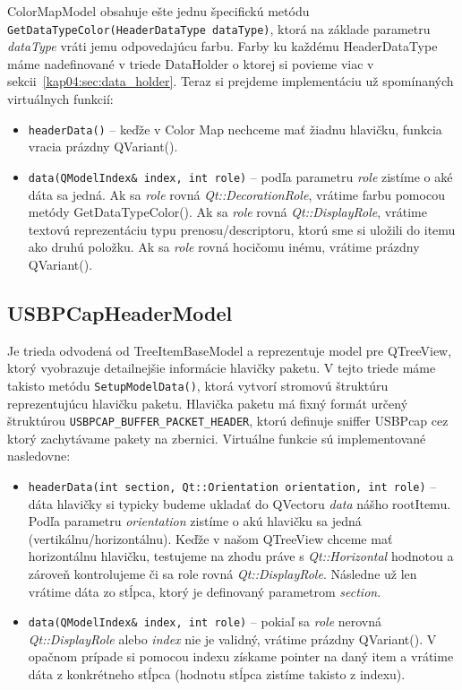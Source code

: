 ColorMapModel obsahuje ešte jednu špecifickú metódu \newline\texttt{GetDataTypeColor(HeaderDataType dataType)}, ktorá na základe parametru \textit{dataType} vráti jemu odpovedajúcu farbu. Farby ku každému HeaderDataType máme nadefinované v triede DataHolder o ktorej si povieme viac v sekcii~\ref{kap04:sec:data_holder}. Teraz si prejdeme implementáciu už spomínaných virtuálnych funkcií:
\begin{itemize}
\item \texttt{headerData()} -- keďže v Color Map nechceme mať žiadnu hlavičku, funkcia vracia prázdny QVariant().
\item \texttt{data(QModelIndex\& index, int role)} -- podľa parametru \textit{role} zistíme o aké dáta sa jedná. Ak sa \textit{role} rovná \textit{Qt::DecorationRole}, vrátime farbu pomocou metódy GetDataTypeColor(). Ak sa \textit{role} rovná \textit{Qt::DisplayRole}, vrátime textovú reprezentáciu typu prenosu/descriptoru, ktorú sme si uložili do itemu ako druhú položku. Ak sa \textit{role} rovná hocičomu inému, vrátime prázdny QVariant().
\end{itemize}


\subsection{USBPCapHeaderModel}
Je trieda odvodená od TreeItemBaseModel a reprezentuje model pre QTreeView, ktorý vyobrazuje detailnejšie informácie hlavičky paketu. V tejto triede máme takisto metódu \texttt{SetupModelData()}, ktorá vytvorí stromovú štruktúru reprezentujúcu hlavičku paketu. Hlavička paketu má fixný formát určený štruktúrou \texttt{USBPCAP\_BUFFER\_PACKET\_HEADER}, ktorú definuje sniffer USBPcap cez ktorý zachytávame pakety na zbernici.
Virtuálne funkcie sú implementované nasledovne:
\begin{itemize}
\label{kap04:sec:usbh_virt}
\item \texttt{headerData(int section, Qt::Orientation orientation, int \newline role)} -- dáta hlavičky si typicky budeme ukladať do QVectoru \textit{data} nášho rootItemu. Podľa parametru \textit{orientation} zistíme o akú hlavičku sa jedná (vertikálnu/horizontálnu). Keďže v našom QTreeView chceme mať horizontálnu hlavičku, testujeme na zhodu práve s \textit{Qt::Horizontal} hodnotou a zároveň kontrolujeme či sa role rovná \textit{Qt::DisplayRole}. Následne už len vrátime dáta zo stĺpca, ktorý je definovaný parametrom \textit{section}.
\item \texttt{data(QModelIndex\& index, int role)} -- pokiaľ sa \textit{role} nerovná \newline \textit{Qt::DisplayRole} alebo \textit{index} nie je validný, vrátime prázdny QVariant(). V opačnom prípade si pomocou indexu získame pointer na daný item a vrátime dáta z konkrétneho stĺpca (hodnotu stĺpca zistíme takisto z indexu).
\end{itemize}

